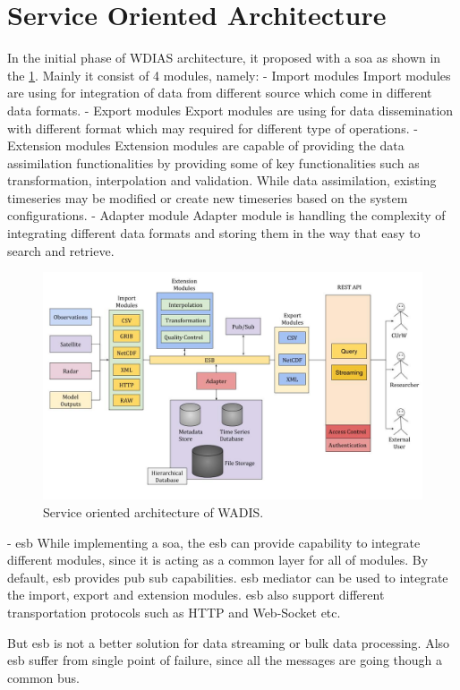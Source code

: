\section{Service Oriented Architecture}

In the initial phase of WDIAS architecture, it proposed with a \acrfull{soa} as shown in the \ref{fi:proposed_soa}. Mainly it consist of 4 modules, namely:
- Import modules
Import modules are using for integration of data from different source which come in different data formats.
- Export modules
Export modules are using for data dissemination with different format which may required for different type of operations.
- Extension modules
Extension modules are capable of providing the data assimilation functionalities by providing some of key functionalities such as transformation, interpolation and validation. While data assimilation, existing timeseries may be modified or create new timeseries based on the system configurations.
- Adapter module
Adapter module is handling the complexity of integrating different data formats and storing them in the way that easy to search and retrieve.

\begin{figure}[htp]
    \centering
    \includegraphics[width=1\textwidth]{soa/soa_v1.jpg}
    \caption{Service oriented architecture of WADIS.}
    \label{fi:proposed_soa}
\end{figure}

- \acrfull{esb}
While implementing a \acrfull{soa}, the \acrfull{esb} can provide capability to integrate different modules, since it is acting as a common layer for all of modules.
By default, \acrshort{esb} provides pub sub capabilities.
\acrshort{esb} mediator can be used to integrate the import, export and extension modules. \acrshort{esb} also support different transportation protocols such as HTTP and Web-Socket etc.

But \acrshort{esb} is not a better solution for data streaming or bulk data processing. Also \acrshort{esb} suffer from single point of failure, since all the messages are going though a common bus.